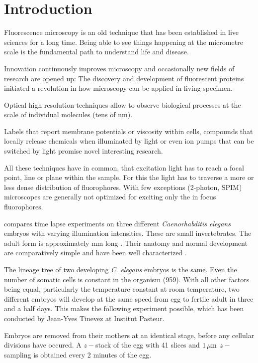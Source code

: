 \chapter{Introduction}
\label{sec:intro}
Fluorescence microscopy is an old technique that has been established
in live sciences for a long time. Being able to see things happening
at the micrometre scale is the fundamental path to understand life and
disease.

Innovation continuously improves microscopy and occasionally new
fields of research are opened up: The discovery and development of
fluorescent proteins initiated a revolution in how microscopy can be
applied in living specimen. 

Optical high resolution techniques allow to observe biological
processes at the scale of individual molecules (tens of nm).

Labels that report membrane potentials or viscosity within cells,
compounds that locally release chemicals when illuminated by light or
even ion pumps that can be switched by light promise novel interesting
research.

All these techniques have in common, that excitation light has to
reach a focal point, line or plane within the sample. For this the
light has to traverse a more or less dense distribution of
fluorophores.  With few exceptions (2-photon, SPIM) microscopes are
generally not optimized for exciting only the in focus fluorophores.

 compares time lapse experiments on three
different \emph{Caenorhabditis elegans} embryos with varying
illumination intensities. These are small invertebrates. The adult
form is approximately \unit[1]{mm} long . Their anatomy and normal
development are comparatively simple and have been well characterized
\citep{Durbin1987}.

The lineage tree of two developing \emph{C. elegans} embryos is the
same.  Even the number of somatic cells is constant in the organism
(959). With all other factors being equal, particularly the
temperature constant at room temperature, two different embryos will
develop at the same speed from egg to fertile adult in three and a
half days. This makes the following experiment possible, which has
been conducted by Jean-Yves Tinevez at Institut Pasteur.

Embryos are removed from their mothers at an identical stage, before
any cellular divisions have occured. A $z-$stack of the egg with 41
slices and $\unit[1]{\mu m}$ $z-$sampling is obtained every 2 minutes
of the egg.

